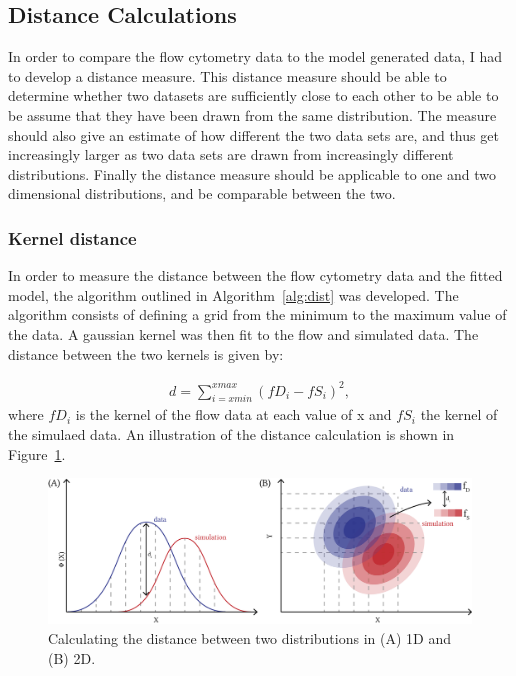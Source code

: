 \subsection{Distance Calculations}

In order to compare the flow cytometry data to the model generated data, I had to develop a distance measure. This distance measure should be able to determine whether two datasets are sufficiently close to each other to be able to be assume that they have been drawn from the same distribution. The measure should also give an estimate of how different the two data sets are, and thus get increasingly larger as two data sets are drawn from increasingly different distributions. Finally the distance measure should be applicable to one and two dimensional distributions, and be comparable between the two. 


\label{sec:dist}
\subsubsection{Kernel distance}
\label{sec:dist_kernel}
In order to measure the distance between the flow cytometry data and the fitted model, the algorithm outlined in Algorithm~\ref{alg:dist} was developed. The algorithm consists of defining a grid from the minimum to the maximum value of the data. A gaussian kernel was then fit to the flow and simulated data. The distance between the two kernels is given by:

\begin{align*}%
	d = \sum_{i=xmin}^{xmax} (fD_i - fS_i)^2,
\end{align*}
where $fD_i$ is the kernel of the flow data at each value of x and $fS_i$ the kernel of the simulaed data. An illustration of the distance calculation is shown in Figure~\ref{fig:old_dist}.



\begin{figure}[tb]
\centering
\includegraphics[scale=0.8]{../../chapters/chapterABCFlow/images/old_distance.png}
\caption[LoF caption]{\label{fig:old_dist}Calculating the distance between two distributions in (A) 1D and (B) 2D. }
\end{figure}



